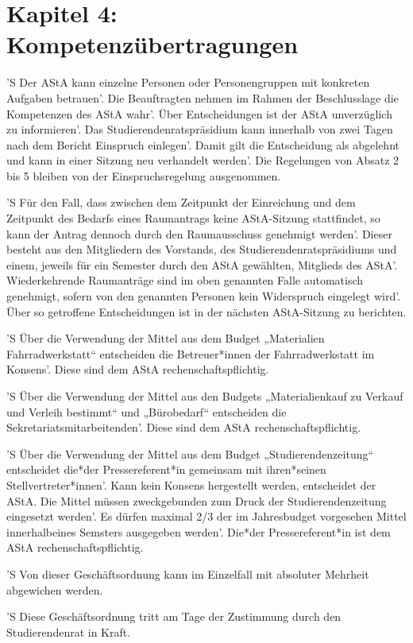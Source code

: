 \documentclass[fontsize=12pt,parskip=half, ref=short]{scrartcl}
\begin{document}
\section*{Kapitel 4: Kompetenzübertragungen}
\begin{contract}
  \label{Par:Kompüber}
  'S Der AStA kann einzelne Personen oder Personengruppen mit konkreten Aufgaben
  betrauen'. Die Beauftragten nehmen im Rahmen der Beschlusslage die Kompetenzen
  des AStA wahr'. Über Entscheidungen ist der AStA unverzüglich zu informieren'.
  Das Studierendenratspräsidium kann innerhalb von zwei Tagen nach dem Bericht
  Einspruch einlegen'. Damit gilt die Entscheidung als abgelehnt und kann in
  einer Sitzung neu verhandelt werden'. Die Regelungen von Absatz 2 bis 5
  bleiben von der Einspruchsregelung ausgenommen.

  'S Für den Fall, dass zwischen dem Zeitpunkt der Einreichung und dem Zeitpunkt
  des Bedarfs eines Raumantrags keine AStA-Sitzung stattfindet, so kann der
  Antrag dennoch durch den Raumausschuss genehmigt werden'. Dieser besteht aus
  den Mitgliedern des Vorstands, des Studierendenratspräsidiums und einem,
  jeweils für ein Semester durch den AStA gewählten, Mitglieds des AStA'.
  Wiederkehrende Raumanträge sind im oben genannten Falle automatisch genehmigt,
  sofern von den genannten Personen kein Widerspruch eingelegt wird'. Über so
  getroffene Entscheidungen ist in der nächsten AStA-Sitzung zu berichten.

  'S Über die Verwendung der Mittel aus dem Budget „Materialien
  Fahrradwerkstatt“ entscheiden die Betreuer*innen der Fahrradwerkstatt im
  Konsens'. Diese sind dem AStA rechenschaftspflichtig.

  'S Über die Verwendung der Mittel aus den Budgets „Materialienkauf zu Verkauf
  und Verleih bestimmt“ und „Bürobedarf“ entscheiden die
  Sekretariatsmitarbeitenden'. Diese sind dem AStA rechenschaftspflichtig.

  'S Über die Verwendung der Mittel aus dem Budget „Studierendenzeitung“
  entscheidet die*der Pressereferent*in gemeinsam mit ihren*seinen
  Stellvertreter*innen'. Kann kein Konsens hergestellt werden, entscheidet der
  AStA. Die Mittel müssen zweckgebunden zum Druck der Studierendenzeitung
  eingesetzt werden'. Es dürfen maximal 2/3 der im Jahresbudget vorgesehen
  Mittel innerhalbeines Semsters ausgegeben werden'. Die*der Pressereferent*in
  ist dem AStA rechenschaftspflichtig.
\end{contract}

\begin{contract}
  'S Von dieser Geschäftsordnung kann im Einzelfall mit absoluter Mehrheit
  abgewichen werden.

  'S Diese Geschäftsordnung tritt am Tage der Zustimmung durch den
  Studierendenrat in Kraft.
\end{contract}
\end{document}
